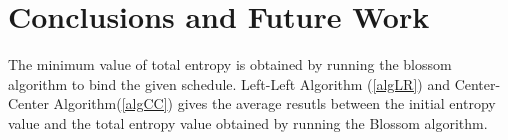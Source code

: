 \documentclass[10pt, conference]{IEEEtran}
\begin{document}
\section{Conclusions and Future Work} \label{concl}
The minimum value of total entropy is obtained by running the blossom algorithm to bind the given schedule. Left-Left Algorithm (\ref{algLR}) and Center-Center Algorithm(\ref{algCC}) gives the average resutls between the initial entropy value and the total entropy value obtained by running the Blossom algorithm.

%

\end{document}
